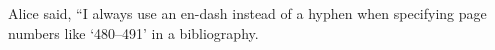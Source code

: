 Alice said, ``I always use an en-dash instead of a hyphen when specifying page
numbers like `480--491' in a bibliography.\bye
